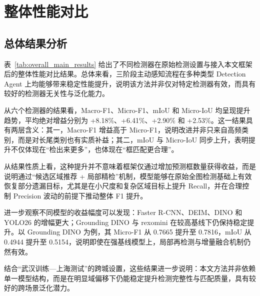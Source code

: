 \section{整体性能对比}
\label{sec:overall_comparison}

\subsection{总体结果分析}
\label{subsec:overall_result_analysis}

表~\ref{tab:overall_main_results} 给出了不同检测器在原始检测设置与接入本文框架后的整体性能对比结果。总体来看，三阶段主动感知流程在多种类型 Detection Agent 上均能够带来稳定性能提升，说明该方法并非仅对特定检测器有效，而具有较好的检测器无关性与泛化能力。

从六个检测器的结果看，Macro-F1、Micro-F1、mIoU 和 Micro-IoU 均呈现提升趋势，平均绝对增益分别为 +8.18\%、+6.41\%、+2.90\% 和 +2.53\%。这一结果具有两层含义：其一，Macro-F1 增益高于 Micro-F1，说明改进并非只来自高频类别，而是对长尾类别也有实质补益；其二，mIoU 与 Micro-IoU 同步上升，表明提升不仅体现在“检出来更多”，也体现在“框匹配更合理”。

从结果性质上看，这种提升并不意味着框架仅通过增加预测框数量获得收益，而是说明通过“候选区域推荐 + 局部精检”机制，模型能够在原始全图检测基础上有效恢复部分遗漏目标，尤其是在小尺度和复杂区域目标上提升 Recall，并在合理控制 Precision 波动的前提下推动整体 F1 提升。

进一步观察不同模型的收益幅度可以发现：Faster R-CNN、DEIM、DINO 和 YOLO26 的增幅更大；Grounding DINO 与 rexomini 在较高基线下仍保持稳定提升。以 Grounding DINO 为例，其 Micro-F1 从 0.7665 提升至 0.7816，mIoU 从 0.4944 提升至 0.5154，说明即使在强基线模型上，局部再检测与增量融合机制仍然有效。

结合“武汉训练—上海测试”的跨城设置，这些结果进一步说明：本文方法并非依赖单一模型结构，而是在明显域偏移下仍能稳定提升检测完整性与匹配质量，具有较好的跨场景泛化潜力。

